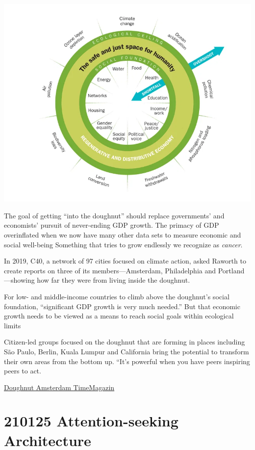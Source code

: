 \documentclass[
]{book}
\begin{document}
\includegraphics{fig/amsterdam-doughnut-economics-3.png}

The goal of getting ``into the doughnut'' should replace governments' and economists' pursuit of never-ending GDP growth.
The primacy of GDP overinflated when we now have many other data sets to measure economic and social well-being
Something that tries to grow endlessly we recognize as \emph{cancer}.

In 2019, C40, a network of 97 cities focused on climate action, asked Raworth to create reports on three of its members---Amsterdam, Philadelphia and Portland---showing how far they were from living inside the doughnut.

For low- and middle-income countries to climb above the doughnut's social foundation, ``significant GDP growth is very much needed.'' But that economic growth needs to be viewed as a means to reach social goals within ecological limits

Citizen-led groups focused on the doughnut that are forming in places including São Paulo, Berlin, Kuala Lumpur and California bring the potential to transform their own areas from the bottom up. ``It's powerful when you have peers inspiring peers to act.

\href{https://time.com/5930093/amsterdam-doughnut-economics/}{Doughnut Amsterdam TimeMagazin}

\hypertarget{attention-seeking-architecture}{%
\section{210125 Attention-seeking Architecture}\label{attention-seeking-architecture}}
\end{document}
